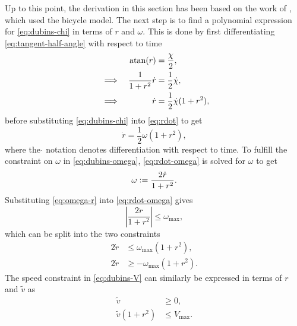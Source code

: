 Up to this point, the derivation in this section has been based on the work of \citet{mercy2017spline}, which used the bicycle model. The next step is to find a polynomial expression for \cref{eq:dubins-chi} in terms of $r$ and $\omega$. This is done by first differentiating \cref{eq:tangent-half-angle} with respect to time
\begin{equation}\label{eq:rdot}
    \begin{aligned}
        &&\operatorname{atan}(r) &= \frac{\chi}{2}, \\
        &\implies& \frac{1}{1 + r^2} \dot r &= \frac{1}{2} \dot \chi, \\
        &\implies& \dot r &= \frac{1}{2} \dot \chi (1 + r^2),
    \end{aligned}
\end{equation}
before substituting \cref{eq:dubins-chi} into \cref{eq:rdot} to get
\begin{equation}\label{eq:rdot-omega}
    \dot r = \frac{1}{2} \omega (1 + r^2),
\end{equation}
where the $\dot{}$ notation denotes differentiation with respect to time.
To fulfill the constraint on $\omega$ in \cref{eq:dubins-omega}, \cref{eq:rdot-omega} is solved for $\omega$ to get
\begin{equation}\label{eq:omega-r}
    \omega \vcentcolon= \frac{2 \dot r}{1 + r^2}.
\end{equation}
Substituting \cref{eq:omega-r} into \cref{eq:rdot-omega} gives
\begin{equation}\label{eq:rdot-omega-r}
    \left|\frac{2 \dot r}{1 + r^2}\right| \leq \omega_{\max},
\end{equation}
which can be split into the two constraints
\begin{subequations}\label{eq:rdot-omega-r-constraints}
    \begin{align}
        2 \dot r &\leq \omega_{\max} (1 + r^2), \label{eq:rdot-omega-r-constraint1} \\
        2 \dot r &\geq -\omega_{\max} (1 + r^2). \label{eq:rdot-omega-r-constraint2}
    \end{align}
\end{subequations}
The speed constraint in \cref{eq:dubins-V} can similarly be expressed in terms of $r$ and $\tilde v$ as
\begin{subequations}\label{eq:V-r}
    \begin{align}
        \tilde v &\ge 0, \\
        \tilde v (1 + r^2) &\leq V_{\max}.
    \end{align}
\end{subequations}


